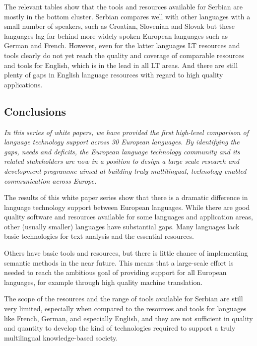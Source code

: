 {\begin{multicols}{2}
The relevant tables show that the tools and resources available for Serbian are mostly in the bottom cluster. Serbian compares well with other languages with a small number of speakers, such as Croatian, Slovenian and Slovak but these languages lag far behind more widely spoken European languages such as German and French. However, even for the latter languages LT resources and tools clearly do not yet reach the quality and coverage of comparable resources and tools for English, which is in the lead in all LT areas. And there are still plenty of gaps in English language resources with regard to high quality applications.


 \subsection {Conclusions}
   
\emph{In this series of white papers, we have provided the first high-level comparison of language technology support across 30 European languages.
By identifying the gaps, needs and deficits, the European language technology community and its related stakeholders are now in a position to design a large scale research and development programme aimed at building truly multilingual, technology-enabled communication across Europe.}

The results of this white paper series show that there is a dramatic difference in language technology support between  European languages. While there are good quality software and resources available for some languages and application areas, other (usually smaller) languages have substantial gaps. Many languages lack basic technologies for text analysis and the essential resources. 

Others have basic tools and resources, but there is little chance of implementing semantic methods in the near future. This means that a large-scale effort is needed to reach the ambitious goal of providing support for all European languages, for example through high quality machine translation.

The scope of the resources and the range of tools available for Serbian are still very limited, especially when compared to the resources and tools for languages like French, German, and especially English, and they are not sufficient in quality and quantity to develop the kind of technologies required to support a truly multilingual knowledge-based society. 


\end{multicols}}
